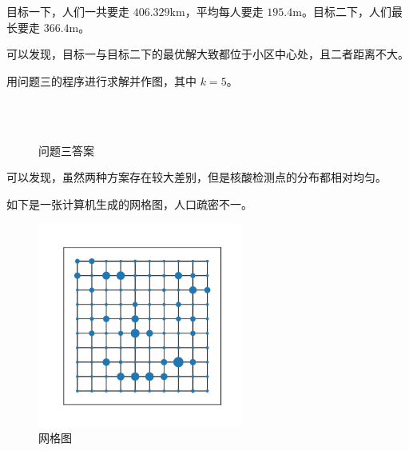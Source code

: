 \documentclass{cumcmthesis}
\begin{document}
目标一下，人们一共要走 $406.329\mathrm{km}$，平均每人要走 $195.4\mathrm{m}$。目标二下，人们最长要走 $366.4\mathrm{m}$。

可以发现，目标一与目标二下的最优解大致都位于小区中心处，且二者距离不大。\newpage

用问题三的程序进行求解并作图，其中 $k=5$。

\begin{figure}[H]
	\centering
	\\
	\\	
	\caption{问题三答案}
\end{figure}

可以发现，虽然两种方案存在较大差别，但是核酸检测点的分布都相对均匀。

\newpage
如下是一张计算机生成的网格图，人口疏密不一。

\begin{figure}[H]
	\centering
	\includegraphics[width=0.6\textwidth]{images/graph_Face.png}
	\caption{网格图}
\end{figure}
\end{document}
